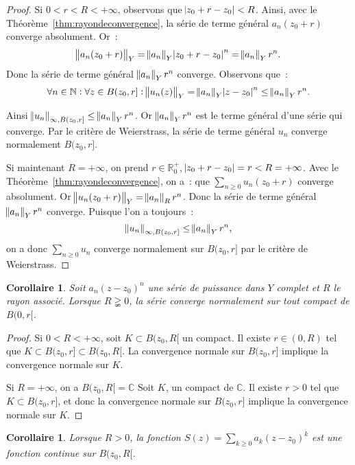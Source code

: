 \documentclass{report}
\newtheorem{cor}[thm]{Corollaire}
\theoremstyle{definition}
\theoremstyle{remark}
\newcommand{\C}{\mathbb C}
\newcommand{\R}{\mathbb R}
\newcommand{\Rp}{\R^{+}}
\newcommand{\N}{\mathbb N}
\newcommand{\pinfty}{{+\infty}}
\begin{document}
			\begin{proof} Si $0 < r < R < \pinfty$, observons que $\abs {z_0 + r - z_0} < R$. Ainsi, avec le Théorème~\ref{thm:rayondeconvergence}, la série
			de terme général $a_n(z_0 + r)$ converge absolument. Or~:
			\[\norm {a_n(z_0 + r)}_Y = \norm {a_n}_Y\abs {z_0 + r - z_0}^n = \norm {a_n}_Yr^n.\]
			Donc la série de terme général $\norm {a_n}_Yr^n$ converge. Observons que~:
			\[\forall n \in \N : \forall z \in B(z_0, r] : \norm {u_n(z)}_Y = \norm {a_n}_Y\abs {z - z_0}^n \leq \norm {a_n}_Yr^n.\]

			Ainsi $\norm {u_n}_{\infty, B(z_0, r]} \leq \norm {a_n}_Yr^n$. Or $\norm {a_n}_Yr^n$ est le terme général d'une série qui converge. Par le critère
			de Weierstrass, la série de terme général $u_n$ converge normalement $B(z_0, r]$.

			Si maintenant $R = \pinfty$, on prend $r \in \Rp_0$, $\abs {z_0 + r - z_0} = r < R = \pinfty$. Avec le Théorème~\ref{thm:rayondeconvergence}, on a~:
			que $\sum_{n \geq 0}u_n(z_0 + r)$ converge absolument. Or $\norm {u_n(z_0 + r)}_Y = \norm {a_n}_Rr^n$. Donc la série de terme général
			$\norm {a_n}_Yr^n$ converge. Puisque l'on a toujours~:
			\[\norm {u_n}_{\infty, B(z_0, r]} \leq \norm {a_n}_Yr^n,\]
			on a donc $\sum_{n \geq 0}u_n$ converge normalement sur $B(z_0, r]$ par le critère de Weierstrass.
			\end{proof}

			\begin{cor} Soit $a_n(z - z_0)^n$ une série de puissance dans $Y$ complet et $R$ le rayon associé. Lorsque $R \gneqq 0$, la série converge normalement
			sur tout compact de $B(0, r[$.
			\end{cor}

			\begin{proof} Si $0 < R < \pinfty$, soit $K \subset B(z_0, R[$ un compact. Il existe $r \in (0, R)$ tel que $K \subset B(z_0, r] \subset B(z_0, R[$.
			La convergence normale sur $B(z_0, r]$ implique la convergence normale sur $K$.

			Si $R = \pinfty$, on a $B(z_0, R[ = \C$ Soit $K$, un compact de $\C$. Il existe $r > 0$ tel que $K \subset B(z_0, r]$, et donc la convergence
			normale sur $B(z_0, r]$ implique la convergence normale sur $K$.
			\end{proof}

			\begin{cor} Lorsque $R > 0$, la fonction $S(z) = \sum_{k \geq 0}a_k(z - z_0)^k$ est une fonction continue sur $B(z_0, R[$.
			\end{cor}
\end{document}
